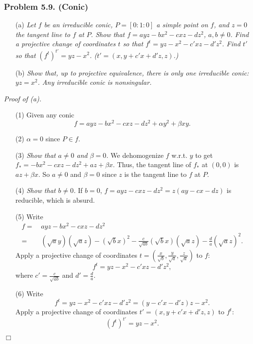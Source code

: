 \documentclass{article}
\begin{document}



\subsubsection*{Problem 5.9. (Conic)}
\begin{enumerate}
\item[(a)]
  \emph{Let $f$ be an irreducible conic, $P = [0:1:0]$ a simple point on $f$,
  and $z=0$ the tangent line to $f$ at $P$.
  Show that $f = ayz - bx^2 - cxz - dz^2$, $a, b \neq 0$.
  Find a projective change of coordinates $t$ so that $f^{t} = yz - x^2 - c'xz - d'z^2$.
  Find $t'$ so that $(f^{t})^{t'} = yz - x^2$.
  ($t' = (x, y+c'x+d'z, z)$.) }

\item[(b)]
  \emph{Show that, up to projective equivalence,
  there is only one irreducible conic: $yz = x^2$.
  Any irreducible conic is nonsingular.} \\
\end{enumerate}



\emph{Proof of (a).}
\begin{enumerate}
\item[(1)]
  Given any conic
  \[
    f = ayz - bx^2 - cxz - dz^2
      + \alpha y^2 + \beta xy.
  \]

\item[(2)]
  $\alpha = 0$ since $P \in f$.

\item[(3)]
  \emph{Show that $a \neq 0$ and $\beta = 0$.}
  We dehomogenize $f$ w.r.t. $y$ to get
  $f_{*} = -bx^2 -cxz-dz^2 + az + \beta x$.
  Thus, the tangent line of $f_{*}$ at $(0,0)$ is $az + \beta x$.
  So $a \neq 0$ and $\beta = 0$ since $z$ is the tangent line to $f$ at $P$.

\item[(4)]
  \emph{Show that $b \neq 0$.}
  If $b = 0$,
  $f = ayz - cxz - dz^2 = z(ay - cx - dz)$ is reducible, which is absurd.

\item[(5)]
  Write
  \begin{align*}
    f
    =& \: ayz - bx^2 - cxz - dz^2 \\
    =& \: (\sqrt{a}y)(\sqrt{a}z)
      - (\sqrt{b}x)^2
      - \frac{c}{\sqrt{ab}} (\sqrt{b}x)(\sqrt{a}z)
      - \frac{d}{a} (\sqrt{a}z)^2.
  \end{align*}
  Apply a projective change of coordinates
  $t = \left( \frac{x}{\sqrt{b}}, \frac{y}{\sqrt{a}}, \frac{z}{\sqrt{a}} \right)$ to $f$:
  \[
    f^{t} = yz - x^2 - c'xz - d'z^2,
  \]
  where $c' = \frac{c}{\sqrt{ab}}$ and $d' = \frac{d}{a}$.

\item[(6)]
  Write
  \[
    f^{t}
    = yz - x^2 - c'xz - d'z^2
    = (y - c'x - d'z)z - x^2.
  \]
  Apply a projective change of coordinates $t' = (x, y+c'x+d'z, z)$ to $f^{t}$:
  \[
    (f^{t})^{t'} = yz - x^2.
  \]
\end{enumerate}
$\Box$ \\
\end{document}

